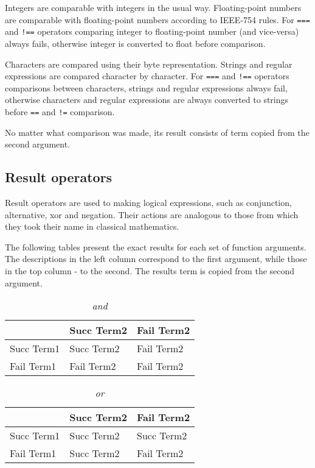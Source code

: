 Integers are comparable with integers in the usual way. Floating-point numbers are comparable with floating-point numbers according to IEEE-754\cite{IEEE754} rules. For \lstinline{===} and \lstinline{!==} operators comparing integer to floating-point number (and vice-versa) always fails, otherwise integer is converted to float before comparison.

Characters are compared using their byte representation. Strings and regular expressions are compared character by character. For \lstinline{===} and \lstinline{!==} operators comparisons between characters, strings and regular expressions always fail, otherwise characters and regular expressions are always converted to strings before \lstinline{==} and \lstinline{!=} comparison.

No matter what comparison was made, its result consists of term copied from the second argument.

\subsection{Result operators}

Result operators are used to making logical expressions, such as conjunction, alternative, xor and negation. Their actions are analogous to those from which they took their name in classical mathematics.

The following tables present the exact results for each set of function arguments. The descriptions in the left column correspond to the first argument, while those in the top column - to the second. The results term is copied from the second argument.

\begin{bnfutils}
  \begin{table}[ht]
    \caption{\emph{and}}
    \begin{center}
    \begin{tabular}[t]{l|l|l}
       & Succ Term2 & Fail Term2 \\
      \hline
      Succ Term1 & Succ Term2 & Fail Term2 \\
      Fail Term1 & Fail Term2 & Fail Term2 
    \end{tabular}
    \end{center}
  \end{table}
\end{bnfutils}

\begin{bnfutils}
  \begin{table}[ht]
    \caption{\emph{or}}
    \begin{center}
    \begin{tabular}[t]{l|l|l}
        & Succ Term2 & Fail Term2 \\
      \hline
      Succ Term1 & Succ Term2 & Succ Term2 \\
      Fail Term1 & Succ Term2 & Fail Term2 
    \end{tabular}
    \end{center}
  \end{table}
\end{bnfutils}

